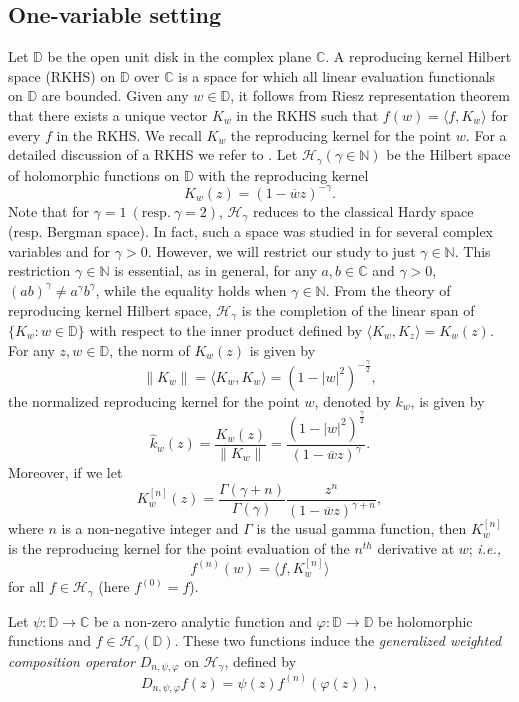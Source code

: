 \documentclass[12pt, reqno]{amsart}
\theoremstyle{definition}
\theoremstyle{remark}
\numberwithin{equation}{section}
\begin{document}
\subsection{One-variable setting}
Let $\mathbb{D}$ be the open unit disk in the complex plane $\mathbb{C}$. A reproducing kernel Hilbert space (RKHS) on $\mathbb{D}$ over $\mathbb{C}$ is a space for which all linear evaluation functionals on $\mathbb{D}$ are bounded. Given any $w\in \mathbb{D}$, it follows from Riesz representation theorem that there exists a unique vector $K_w$ in the RKHS such that $f(w)=\langle f, K_w \rangle$ for every $f$ in the RKHS. We recall $K_w$ the reproducing kernel for the point $w$. For a detailed discussion of a RKHS we refer to \cite{Paulsen_Raghupathi_2016}. Let $\mathcal{H}_\gamma (\gamma\in \mathbb{N})$ be the Hilbert space of holomorphic functions on $\mathbb{D}$ with the reproducing kernel $$ K_w(z)=(1-\overline{w}z)^{-\gamma}.$$ Note that for $\gamma=1~ (\mbox{resp}. ~ \gamma=2)$, $\mathcal{H}_\gamma$ reduces to the classical  Hardy space (resp. Bergman space). In fact, such a space was studied in \cite{Le_JMAA_2012} for several complex variables and for $\gamma>0$. However, we will restrict our study to just $\gamma \in \mathbb{N}$. This restriction $\gamma \in \mathbb{N}$ is essential, as in general, for any $a, b \in \mathbb{C}$ and $\gamma>0$, $(ab)^\gamma\neq a^\gamma b^\gamma$, while the equality holds when $\gamma \in \mathbb{N}$. From the theory of reproducing kernel Hilbert space, $\mathcal{H}_\gamma$ is the completion of the linear span of $\{ K_w: w\in \mathbb{D}\}$ with respect to the inner product defined by $\langle K_w, K_z \rangle=K_w(z)$. For any $z, w\in \mathbb{D}$, the norm of $K_w(z)$ is given by $$\|K_w\|=\langle K_w, K_w \rangle=(1-|w|^2)^{-\frac{\gamma}{2}},$$   
the normalized reproducing kernel  for the point $w$, denoted by $k_w$, is given by $$\widehat{k}_w(z)=\frac{K_w(z)}{\|K_w\|}=\frac{(1-|w|^2)^{\frac{\gamma}{2}}}{(1-\overline{w}z)^{\gamma}}.$$      
Moreover, if we let $$K_{w}^{[n]}(z)=\frac{\Gamma(\gamma+n)}{\Gamma(\gamma)}\frac{z^n}{(1-\overline{w}z)^{\gamma+n}},$$
where $n$ is a non-negative integer and $\Gamma$ is the usual gamma function, then $K_{w}^{[n]}$ is the reproducing kernel for the point evaluation of the $n^{th}$ derivative at $w$; {\it i.e.,}
$$f^{(n)}(w)=\langle f, K_{w}^{[n]} \rangle$$  
for all $f\in \mathcal{H}_\gamma$ (here $f^{(0)}=f$).\\[2mm]
\par
Let $\psi: \mathbb{D}\longrightarrow \mathbb{C}$ be a non-zero analytic function and $\varphi: \mathbb{D}\longrightarrow \mathbb{D}$ be holomorphic functions and $f\in \mathcal{H}_\gamma(\mathbb{D})$. These two functions induce the {\it generalized weighted composition operator} $D_{n, \psi, \varphi}$ on $\mathcal{H}_\gamma$, defined by $$ D_{n, \psi, \varphi}f(z)=\psi(z)f^{(n)}(\varphi(z)),$$
\end{document}
